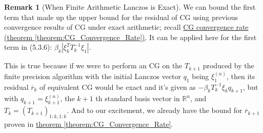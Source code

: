 \documentclass[]{article}
\theoremstyle{definition}
\newtheorem{remark}{Remark}[subsection]  %
\begin{document}
            \begin{remark}[When Finite Arithmetic Lanczos is Exact]\label{remark:CG_Float_Remark}
                We can bound the first term that made up the upper bound for the residual of CG using previous convergence results of CG under exact arithmetic; recall \hyperref[theorem:CG_Convergence_Rate]{CG convergence rate (theorem \ref*{theorem:CG_Convergence_Rate})}. It can be applied here for the first term in (5.3.6): 
                $\beta_k |
                \xi_k^T T_k^{-1}\xi_1|$. 
                \par
                This is true because if we were to perform an CG on the $T_{k + 1}$ produced by the finite precision algorithm with the initial Lanczos vector $q_1$ being $\xi_1^{(n)}$, then its residual $\overline{r}_{k}$ of equivalent CG would be exact and it's given as $-\beta_kT_{k}^{-1}\xi_kq_{k + 1}$, but with $q_{k + 1} = \xi_{k + 1}^{(n)}$, the $k + 1$ th standard basis vector in $\mathbb R^{n}$, and $T_k = (T_{k + 1})_{1:k, 1:k}$. And to our excitement, we already have the bound for $\overline{r}_{k+1}$ proven in \hyperref[theorem:CG_Convergence_Rate]{theorem \ref*{theorem:CG_Convergence_Rate}}.
            \end{remark}
\end{document}
